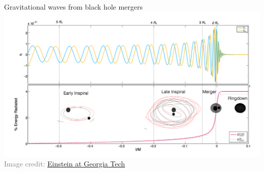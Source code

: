 \begin{frame}{Gravitational waves from black hole mergers}
\vskip 5pt
\centering
\includegraphics[width=\linewidth]{img/BBH_GT}\\
\vskip -10pt
\qquad\qquad\qquad\qquad\qquad\qquad\qquad\qquad\qquad\qquad\textcolor{gray}{\fontsize{7.5}{10}\selectfont Image credit:
\href{https://einstein.gatech.edu/catalog/}{Einstein at Georgia Tech}}
\end{frame}


